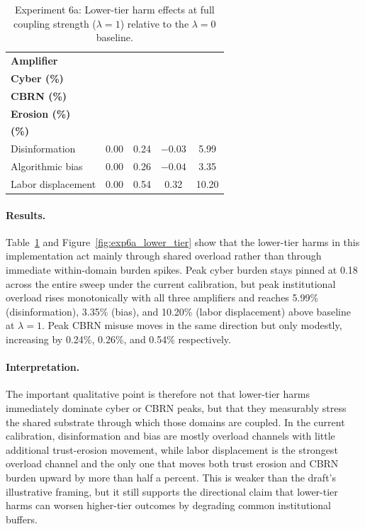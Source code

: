 \documentclass[11pt]{article}
\begin{document}
\begin{table}[t]
\centering
\caption{Experiment 6a: Lower-tier harm effects at full coupling strength ($\lambda = 1$) relative to the $\lambda = 0$ baseline.}
\label{tab:exp6a}
\small
\begin{tabular}{@{}lcccc@{}}
\toprule
\textbf{Amplifier} & \makecell{\textbf{$\Delta$ Peak}\\\textbf{Cyber (\%)}} & \makecell{\textbf{$\Delta$ Peak}\\\textbf{CBRN (\%)}} & \makecell{\textbf{$\Delta$ Trust}\\\textbf{Erosion (\%)}} & \makecell{\textbf{$\Delta$ Inst.\ Overload}\\\textbf{(\%)}} \\
\midrule
Disinformation & 0.00 & 0.24 & $-0.03$ & 5.99 \\
Algorithmic bias & 0.00 & 0.26 & $-0.04$ & 3.35 \\
Labor displacement & 0.00 & 0.54 & 0.32 & 10.20 \\
\bottomrule
\end{tabular}
\end{table}

\paragraph{Results.} Table~\ref{tab:exp6a} and Figure~\ref{fig:exp6a_lower_tier} show that the lower-tier harms in this implementation act mainly through shared overload rather than through immediate within-domain burden spikes. Peak cyber burden stays pinned at 0.18 across the entire sweep under the current calibration, but peak institutional overload rises monotonically with all three amplifiers and reaches 5.99\% (disinformation), 3.35\% (bias), and 10.20\% (labor displacement) above baseline at $\lambda = 1$. Peak CBRN misuse moves in the same direction but only modestly, increasing by 0.24\%, 0.26\%, and 0.54\% respectively.

\paragraph{Interpretation.} The important qualitative point is therefore not that lower-tier harms immediately dominate cyber or CBRN peaks, but that they measurably stress the shared substrate through which those domains are coupled. In the current calibration, disinformation and bias are mostly overload channels with little additional trust-erosion movement, while labor displacement is the strongest overload channel and the only one that moves both trust erosion and CBRN burden upward by more than half a percent. This is weaker than the draft's illustrative framing, but it still supports the directional claim that lower-tier harms can worsen higher-tier outcomes by degrading common institutional buffers.
\end{document}
